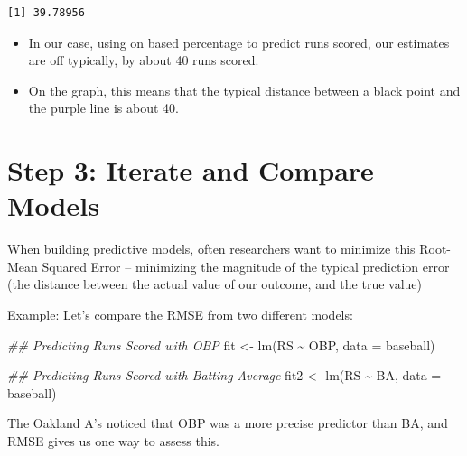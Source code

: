 \documentclass[
  letterpaper,
  DIV=11,
  numbers=noendperiod]{scrreprt}
\newenvironment{Shaded}{\begin{snugshade}}{\end{snugshade}}
\newcommand{\AttributeTok}[1]{\textcolor[rgb]{0.40,0.45,0.13}{#1}}
\newcommand{\DecValTok}[1]{\textcolor[rgb]{0.68,0.00,0.00}{#1}}
\newcommand{\DocumentationTok}[1]{\textcolor[rgb]{0.37,0.37,0.37}{\textit{#1}}}
\newcommand{\FunctionTok}[1]{\textcolor[rgb]{0.28,0.35,0.67}{#1}}
\newcommand{\NormalTok}[1]{\textcolor[rgb]{0.00,0.23,0.31}{#1}}
\newcommand{\OtherTok}[1]{\textcolor[rgb]{0.00,0.23,0.31}{#1}}
\newcommand{\SpecialCharTok}[1]{\textcolor[rgb]{0.37,0.37,0.37}{#1}}
\providecommand{\tightlist}{%
  \setlength{\itemsep}{0pt}\setlength{\parskip}{0pt}}\usepackage{longtable,booktabs,array}
\begin{document}
\begin{Shaded}
\end{Shaded}

\begin{verbatim}
[1] 39.78956
\end{verbatim}

\begin{itemize}
\tightlist
\item
  In our case, using on based percentage to predict runs scored, our
  estimates are off typically, by about 40 runs scored.
\item
  On the graph, this means that the typical distance between a black
  point and the purple line is about 40.
\end{itemize}

\hypertarget{step-3-iterate-and-compare-models}{%
\section{Step 3: Iterate and Compare
Models}\label{step-3-iterate-and-compare-models}}

When building predictive models, often researchers want to minimize this
Root-Mean Squared Error -- minimizing the magnitude of the typical
prediction error (the distance between the actual value of our outcome,
and the true value)

Example: Let's compare the RMSE from two different models:

\begin{Shaded}
\begin{Highlighting}[]
\DocumentationTok{\#\# Predicting Runs Scored with OBP}
\NormalTok{fit }\OtherTok{\textless{}{-}} \FunctionTok{lm}\NormalTok{(RS }\SpecialCharTok{\textasciitilde{}}\NormalTok{ OBP, }\AttributeTok{data =}\NormalTok{ baseball)}

\DocumentationTok{\#\# Predicting Runs Scored with Batting Average}
\NormalTok{fit2 }\OtherTok{\textless{}{-}} \FunctionTok{lm}\NormalTok{(RS }\SpecialCharTok{\textasciitilde{}}\NormalTok{ BA, }\AttributeTok{data =}\NormalTok{ baseball)}
\end{Highlighting}
\end{Shaded}

The Oakland A's noticed that OBP was a more precise predictor than BA,
and RMSE gives us one way to assess this.
\end{document}

